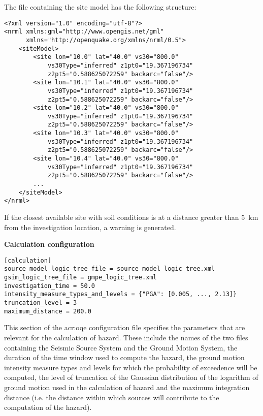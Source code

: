 The file containing the site model has the following structure:

\begin{verbatim}
<?xml version="1.0" encoding="utf-8"?>
<nrml xmlns:gml="http://www.opengis.net/gml"
      xmlns="http://openquake.org/xmlns/nrml/0.5">
    <siteModel>
        <site lon="10.0" lat="40.0" vs30="800.0" 
            vs30Type="inferred" z1pt0="19.367196734"
            z2pt5="0.588625072259" backarc="false"/>
        <site lon="10.1" lat="40.0" vs30="800.0" 
            vs30Type="inferred" z1pt0="19.367196734"
            z2pt5="0.588625072259" backarc="false"/>
        <site lon="10.2" lat="40.0" vs30="800.0" 
            vs30Type="inferred" z1pt0="19.367196734"
            z2pt5="0.588625072259" backarc="false"/>
        <site lon="10.3" lat="40.0" vs30="800.0" 
            vs30Type="inferred" z1pt0="19.367196734"
            z2pt5="0.588625072259" backarc="false"/>
        <site lon="10.4" lat="40.0" vs30="800.0" 
            vs30Type="inferred" z1pt0="19.367196734"
            z2pt5="0.588625072259" backarc="false"/>
        ...
    </siteModel>
</nrml>
\end{verbatim}
%

If the closest available site with soil conditions is at a distance greater than 5~km from the investigation location, a warning is generated.

\textbf{Calculation configuration}
\label{sec:calculation_configuration}

\begin{verbatim}
[calculation]
source_model_logic_tree_file = source_model_logic_tree.xml
gsim_logic_tree_file = gmpe_logic_tree.xml
investigation_time = 50.0
intensity_measure_types_and_levels = {"PGA": [0.005, ..., 2.13]}
truncation_level = 3
maximum_distance = 200.0
\end{verbatim}

This section of the \gls{acr:oqe} configuration file specifies the parameters that are relevant for the calculation of hazard. These include the names of the two files containing the Seismic Source System and the Ground Motion System, the duration of the time window used to compute the  hazard, the ground motion intensity measure types and levels for  which the probability of exceedence will be computed, the level of truncation of the Gaussian distribution of the logarithm of ground motion used in the calculation of hazard and the maximum integration distance (i.e. the distance within which sources will contribute to the computation of the hazard).

